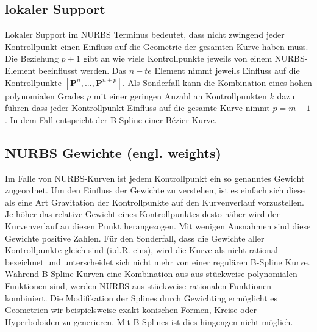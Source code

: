 \documentclass[german,a4paper,12pt,oneside]{scrbook}
\theoremstyle{definition}
\theoremstyle{definition}
\theoremstyle{definition}
\theoremstyle{definition}
\theoremstyle{definition}
\theoremstyle{definition}
\begin{document}
\subsection{lokaler Support}
Lokaler Support im NURBS Terminus bedeutet, dass nicht zwingend jeder Kontrollpunkt einen Einfluss auf die Geometrie der gesamten Kurve haben muss. Die Beziehung $p+1$ gibt an wie viele Kontrollpunkte jeweils von einem NURBS-Element beeinflusst werden. Das $n-te$ Element nimmt jeweils Einfluss auf die Kontrollpunkte $[\bm{P}^{n},...,\bm{P}^{n+p}]$. Als Sonderfall kann die Kombination eines hohen polynomialen Grades $p$ mit einer geringen Anzahl an Kontrollpunkten $k$ dazu führen dass jeder Kontrollpunkt Einfluss auf die gesamte Kurve nimmt $p = m-1$. In dem Fall entspricht der B-Spline einer Bézier-Kurve.


\subsection{NURBS Gewichte (engl. weights)}
Im Falle von NURBS-Kurven ist jedem Kontrollpunkt ein so genanntes Gewicht zugeordnet. Um den Einfluss der Gewichte zu verstehen, ist es einfach sich diese als eine Art Gravitation der Kontrollpunkte auf den Kurvenverlauf vorzustellen. Je höher das relative Gewicht eines Kontrollpunktes desto näher wird der Kurvenverlauf an diesen Punkt herangezogen. Mit wenigen Ausnahmen sind diese Gewichte positive Zahlen. Für den Sonderfall, dass die Gewichte aller Kontrollpunkte gleich sind (i.d.R. eins), wird die Kurve als nicht-rational bezeichnet und unterscheidet sich nicht mehr von einer regulären B-Spline Kurve.  Während B-Spline Kurven eine Kombination aus aus stückweise polynomialen Funktionen sind, werden NURBS aus stückweise rationalen Funktionen kombiniert. Die Modifikation der Splines durch Gewichting ermöglicht es Geometrien wir beispielsweise exakt konischen Formen, Kreise oder Hyperboloiden zu generieren. Mit B-Splines ist dies hingengen nicht möglich. 
\end{document}
